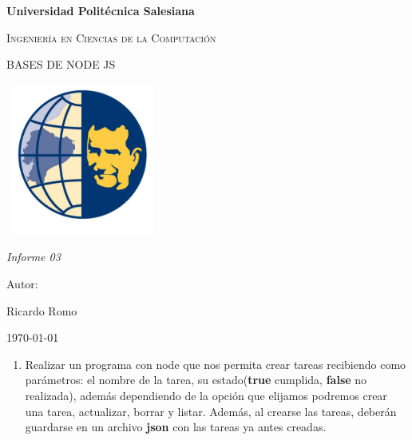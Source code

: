 \documentclass{report}
\begin{document}
\begin{titlepage}
    \centering
    {\bfseries\LARGE Universidad Politécnica Salesiana \par}
    \vspace{1cm}
    {\scshape\Large Ingeniería en Ciencias de la Computación \par}
    \vspace{3cm}
    {\scshape\Huge BASES DE NODE JS \par}
    \vspace{1cm}
    {\center\includegraphics[width=5cm, height=5cm]{ups1.png}\\}
    \vspace{1cm}
    {\itshape\Large Informe 03 \par}
    \vfill
    {\Large Autor: \par}
    {\Large Ricardo Romo \par}
    \vfill
    {\Large \today \par}
    \end{titlepage}    

    
\begin{enumerate}
  \item Realizar un programa con node que nos permita crear tareas recibiendo como parámetros: el nombre de la tarea, su estado(\textbf{true} cumplida, \textbf{false} no realizada), además dependiendo de la opción que elijamos podremos crear una tarea, actualizar, borrar y listar.
  Además, al crearse las tareas, deberán guardarse en un archivo \textbf{json} con las tareas ya antes creadas.
\end{enumerate}
\end{document}
